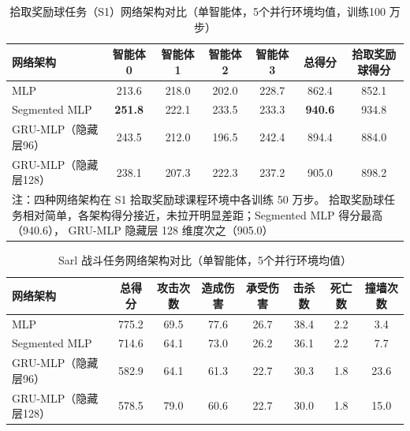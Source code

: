 \documentclass[12pt, a4paper, UTF8]{ctexart}
\numberwithin{equation}{section}
\begin{document}
\begin{table}[htbp]
  \centering
  \caption{ 拾取奖励球任务（S1）网络架构对比（单智能体，5个并行环境均值，训练100 万步）}
  \label{tab:appendix_s1_network}
  \begin{tabular}{lcccccc}
    \toprule
    网络架构 & 智能体0 & 智能体1 & 智能体2 & 智能体3 & 总得分 & 拾取奖励球得分 \\
    \midrule
    MLP                & 213.6 & 218.0 & 202.0 & 228.7 & 862.4 & 852.1 \\
    Segmented MLP      & \textbf{251.8} & 222.1 & 233.5 & 233.3 & \textbf{940.6} & 934.8 \\
    GRU-MLP（隐藏层96） & 243.5 & 212.0 & 196.5 & 242.4 & 894.4 & 884.0 \\
    GRU-MLP（隐藏层128）& 238.1 & 207.3 & 222.3 & 237.2 & 905.0 & 898.2 \\
    \midrule
    \multicolumn{7}{p{0.85\textwidth}}{%
      注：四种网络架构在 S1 拾取奖励球课程环境中各训练 50 万步。
      拾取奖励球任务相对简单，各架构得分接近，未拉开明显差距；Segmented MLP 得分最高（940.6），
      GRU-MLP 隐藏层 128 维度次之（905.0）} \\
  \end{tabular}
\end{table}
\begin{table}[htbp]
  \centering
  \caption{ Sarl 战斗任务网络架构对比（单智能体，5个并行环境均值）}
  \label{tab:network_sarl_detail}
  \setlength{\tabcolsep}{3.5pt}
  \begin{tabular}{lccccccc}
    \toprule
    网络架构 & 总得分 & 攻击次数 & 造成伤害 & 承受伤害 & 击杀数 & 死亡数 & 撞墙次数 \\
    \midrule
    MLP                & 775.2 & 69.5 & 77.6 & 26.7 & 38.4 & 2.2 & 3.4  \\
    Segmented MLP      & 714.6 & 64.1 & 73.0 & 26.2 & 36.1 & 2.2 & 7.7  \\
    GRU-MLP（隐藏层96） & 582.9 & 64.1 & 61.3 & 22.7 & 30.3 & 1.8 & 23.6 \\
    GRU-MLP（隐藏层128）& 578.5 & 79.0 & 60.6 & 22.7 & 30.0 & 1.8 & 15.0 \\
    \bottomrule
  \end{tabular}
\end{table}
\end{document}
